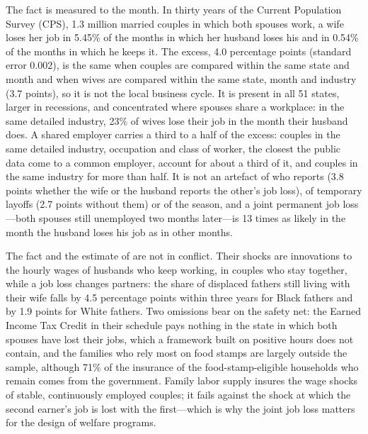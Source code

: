 The fact is measured to the month. In thirty years of the Current Population Survey (CPS), 1.3 million married couples in which both spouses work, a wife loses her job in
5.45\% of the months in which her husband loses his and in 0.54\% of the months in which he keeps it. The excess, 4.0
percentage points (standard error 0.002), is the same when couples are compared within the same state and month and
when wives are compared within the same state, month and industry (3.7 points), so it is not the local business cycle.
It is present in all 51 states, larger in recessions, and concentrated where spouses share a workplace: in the same
detailed industry, 23\% of wives lose their job in the month their husband does. A shared employer carries a third
to a half of the excess: couples in the same detailed industry, occupation and class of worker, the closest the public
data come to a common employer, account for about a third of it, and couples in the same industry for more than half. It is not an artefact of who reports
(3.8 points whether the wife or the husband reports the other's job loss), of temporary layoffs (2.7 points without
them) or of the season, and a joint permanent job loss---both spouses still unemployed two months later---is 13 times as
likely in the month the husband loses his job as in other months.

The fact and the estimate of \citet{blundell2016consumption} are not in conflict. Their shocks are innovations to the
hourly wages of husbands who keep working, in couples who stay together, while a job loss changes partners: the share
of displaced fathers still living with their wife falls by 4.5 percentage points within three years for Black fathers
and by 1.9 points for White fathers. Two omissions bear on the safety net: the Earned Income Tax Credit in their
schedule pays nothing in the state in which both spouses have lost their jobs, which a framework built on positive
hours does not contain, and the families who rely most on food stamps are largely outside the sample, although 71\% of
the insurance of the food-stamp-eligible households who remain comes from the government. Family labor supply insures
the wage shocks of stable, continuously employed couples; it fails against the shock at which the second earner's job
is lost with the first---which is why the joint job loss matters for the design of welfare programs.

